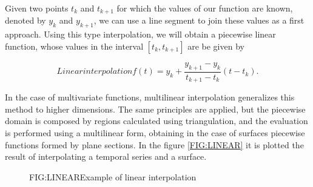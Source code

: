 
Given two points $t_k$ and $t_{k+1}$ for which the values of our function are
known, denoted by $y_k$ and $y_{k+1}$, we can use a line segment to join these
values as a first approach. Using this type interpolation, we will obtain a
piecewise linear function, whose values in the interval $[t_k, t_{k+1}]$ are
be given by

\begin{equation}[]{Linear interpolation}
 f(t)= y_{k}+\frac{y_{k+1}-y_{k}}{t_{k+1}-t_{k}}\left(t-t_{k}\right).
\end{equation}

In the case of multivariate functions, multilinear interpolation
generalizes this method to higher dimensions.
The same principles are applied, but the piecewise domain is composed
by regions calculated using triangulation, and the evaluation is performed
using a multilinear form, obtaining in the case of surfaces piecewise
functions formed by plane sections. In the figure \ref{FIG:LINEAR} it is plotted
the result of interpolating a temporal series and a surface.


\begin{figure}[Example of linear interpolation]{FIG:LINEAR}{Example of linear interpolation}
   \quad
\end{figure}

